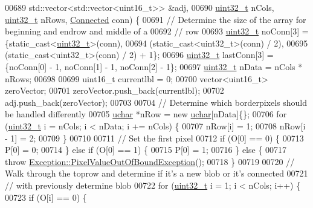 \begin{DoxyCode}
00689                              std::vector<std::vector<uint16\_t>> &adj,
00690                              \hyperlink{_soil_math_types_8h_a435d1572bf3f880d55459d9805097f62}{uint32\_t} nCols, \hyperlink{_soil_math_types_8h_a435d1572bf3f880d55459d9805097f62}{uint32\_t} nRows, 
      \hyperlink{class_vision_1_1_segment_a330240c08320e72270fac0aa83d5e27e}{Connected} conn) \{
00691   \textcolor{comment}{// Determine the size of the array for beginning and endrow and middle of a}
00692   \textcolor{comment}{// row}
00693   \hyperlink{_soil_math_types_8h_a435d1572bf3f880d55459d9805097f62}{uint32\_t} noConn[3] = \{\textcolor{keyword}{static\_cast<}\hyperlink{_soil_math_types_8h_a435d1572bf3f880d55459d9805097f62}{uint32\_t}\textcolor{keyword}{>}(conn),
00694                         (static\_cast<uint32\_t>(conn) / 2),
00695                         (static\_cast<uint32\_t>(conn) / 2) + 1\};
00696   \hyperlink{_soil_math_types_8h_a435d1572bf3f880d55459d9805097f62}{uint32\_t} lastConn[3] = \{noConn[0] - 1, noConn[1] - 1, noConn[2] - 1\};
00697   \hyperlink{_soil_math_types_8h_a435d1572bf3f880d55459d9805097f62}{uint32\_t} nData = nCols * nRows;
00698 
00699   uint16\_t currentlbl = 0;
00700   vector<uint16\_t> zeroVector;
00701   zeroVector.push\_back(currentlbl);
00702   adj.push\_back(zeroVector);
00703 
00704   \textcolor{comment}{// Determine which borderpixels should be handled differently}
00705   \hyperlink{_soil_math_types_8h_a65f85814a8290f9797005d3b28e7e5fc}{uchar} *nRow = \textcolor{keyword}{new} \hyperlink{_soil_math_types_8h_a65f85814a8290f9797005d3b28e7e5fc}{uchar}[nData]\{\};
00706   \textcolor{keywordflow}{for} (\hyperlink{_soil_math_types_8h_a435d1572bf3f880d55459d9805097f62}{uint32\_t} i = nCols; i < nData; i += nCols) \{
00707     nRow[i] = 1;
00708     nRow[i - 1] = 2;
00709   \}
00710 
00711   \textcolor{comment}{// Set the first pixel}
00712   \textcolor{keywordflow}{if} (O[0] == 0) \{
00713     P[0] = 0;
00714   \} \textcolor{keywordflow}{else} \textcolor{keywordflow}{if} (O[0] == 1) \{
00715     P[0] = 1;
00716   \} \textcolor{keywordflow}{else} \{
00717     \textcolor{keywordflow}{throw} \hyperlink{class_vision_1_1_exception_1_1_pixel_value_out_of_bound_exception}{Exception::PixelValueOutOfBoundException}();
00718   \}
00719 
00720   \textcolor{comment}{// Walk through the toprow and determine if it's a new blob or it's connected}
00721   \textcolor{comment}{// with previously determine blob}
00722   \textcolor{keywordflow}{for} (\hyperlink{_soil_math_types_8h_a435d1572bf3f880d55459d9805097f62}{uint32\_t} i = 1; i < nCols; i++) \{
00723     \textcolor{keywordflow}{if} (O[i] == 0) \{

\end{DoxyCode}
